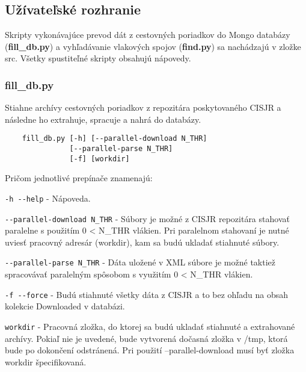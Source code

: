 \documentclass[10pt,xcolor=pdflatex,dvipsnames,table,oneside]{book}
\begin{document}
\subsection*{Užívateľské rozhranie}
\par Skripty vykonávajúce prevod dát z cestovných poriadkov do Mongo databázy (\textbf{fill\_db.py}) a vyhľadávanie vlakových spojov (\textbf{find.py}) sa nachádzajú v zložke src. Všetky spustiteľné skripty obsahujú nápovedy.
\newpage

\subsubsection*{fill\_db.py}
Stiahne archívy cestovných poriadkov z repozitára poskytovaného CISJR a následne ho extrahuje, spracuje a nahrá do databázy.
\newline
\begin{verbatim}
    fill_db.py [-h] [--parallel-download N_THR] 
               [--parallel-parse N_THR] 
               [-f] [workdir]
\end{verbatim}
\newline
Pričom jednotlivé prepínače znamenajú: 

\par \verb|-h --help|  - Nápoveda.
\newline
\par \verb|--parallel-download N_THR|  - Súbory je možné z CISJR repozitára stahovať paralelne s použitím 0 < N\_THR vlákien. Pri paralelnom stahovaní je nutné uviesť pracovný adresár (workdir), kam sa budú ukladať stiahnuté súbory.
\newline
\par \verb|--parallel-parse N_THR|  - Dáta uložené v XML súbore je možné taktiež spracovávať paralelným spôsobom s využitím 0 < N\_THR vlákien.
\newline
\par \verb|-f --force| - Budú stiahnuté všetky dáta z CISJR a to bez ohľadu na obsah kolekcie Downloaded v databázi.
\newline
\par \verb|workdir|  - Pracovná zložka, do ktorej sa budú ukladať stiahnuté a extrahované archívy. Pokiaľ nie je uvedené, bude vytvorená dočasná zložka v /tmp, ktorá bude po dokončení odstránená. Pri použití --parallel-download musí byť zložka workdir špecifikovaná.
\end{document}
